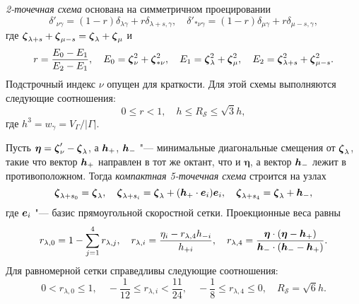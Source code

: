 \emph{2-точечная схема} основана на симметричном проецировании
\begin{equation}\label{eq:uniform_projection}
    \delta'_{\nu\gamma} = (1-r)\delta_{\lambda\gamma} + r\delta_{\lambda+s,\gamma}, \quad
    \delta'_{*\nu\gamma} = (1-r)\delta_{\mu\gamma} + r\delta_{\mu-s,\gamma},
\end{equation}
где \({\boldsymbol{\zeta}}_{\lambda+s} + {\boldsymbol{\zeta}}_{\mu-s} = {\boldsymbol{\zeta}}_{\lambda} + {\boldsymbol{\zeta}}_{\mu}\) и
\begin{equation}\label{eq:stencil_weights2}
    r = \frac{E_0-E_1}{E_2-E_1}, \quad
    E_0 = {\boldsymbol{\zeta}}_{\nu}^2 + {\boldsymbol{\zeta}}_{*\nu}^2, \quad
    E_1 = {\boldsymbol{\zeta}}_{\lambda}^2 + {\boldsymbol{\zeta}}_{\mu}^2, \quad
    E_2 = {\boldsymbol{\zeta}}_{\lambda+s}^2 + {\boldsymbol{\zeta}}_{\mu-s}^2.
\end{equation}
Подстрочный индекс \(\nu\) опущен для краткости.
Для этой схемы выполняются следующие соотношения:
\begin{equation}\label{eq:weights_ranges2}
    0 \leq r < 1, \quad h \leq R_{\mathcal{S}} \leq \sqrt3h,
\end{equation}
где \(h^3 = w_\gamma = V_\Gamma/|\Gamma|\).

Пусть \(\boldsymbol{\eta} = {\boldsymbol{\zeta}}'_{\nu} - {\boldsymbol{\zeta}}_{\lambda}\),
а \({\boldsymbol{h}}_+\), \({\boldsymbol{h}}_-\) "--- минимальные диагональные смещения от \({\boldsymbol{\zeta}}_{\lambda}\),
такие что вектор \({\boldsymbol{h}}_+\) направлен в тот же октант, что и \(\boldsymbol{\eta}\),
а вектор \({\boldsymbol{h}}_-\) лежит в противоположном.
Тогда \emph{компактная 5-точечная схема} строится на узлах
\begin{equation}\label{eq:stencil_nodes5}
    {\boldsymbol{\zeta}}_{\lambda+s_0} = {\boldsymbol{\zeta}}_{\lambda}, \quad
    {\boldsymbol{\zeta}}_{\lambda+s_i} = {\boldsymbol{\zeta}}_{\lambda} + ({\boldsymbol{h}}_+\cdot \boldsymbol{e}_i)\boldsymbol{e}_i, \quad
    {\boldsymbol{\zeta}}_{\lambda+s_4} = {\boldsymbol{\zeta}}_{\lambda} + {\boldsymbol{h}}_-,
\end{equation}
где \(\boldsymbol{e}_i\) "--- базис прямоугольной скоростной сетки. Проекционные веса равны
\begin{equation}\label{eq:stencil_weights5}
    r_{\lambda,0} = 1 - \sum_{j=1}^4 r_{\lambda,j}, \quad
    r_{\lambda,i} = \frac{\eta_i - r_{\lambda,4}h_{-i}}{h_{+i}}, \quad
    r_{\lambda,4} = \frac{\boldsymbol{\eta}\cdot(\boldsymbol{\eta} - {\boldsymbol{h}}_+)}
        {{\boldsymbol{h}}_-\cdot({\boldsymbol{h}}_- - {\boldsymbol{h}}_+)}.
\end{equation}
Для равномерной сетки справедливы следующие соотношения:
\begin{equation}\label{eq:weights_ranges5}
    0 < r_{\lambda,0} \leq 1, \quad
    -\frac1{12} \leq r_{\lambda,i} < \frac{11}{24}, \quad
    -\frac18 \leq r_{\lambda,4} \leq 0, \quad
    R_\mathcal{S} = \sqrt6h.
\end{equation}

